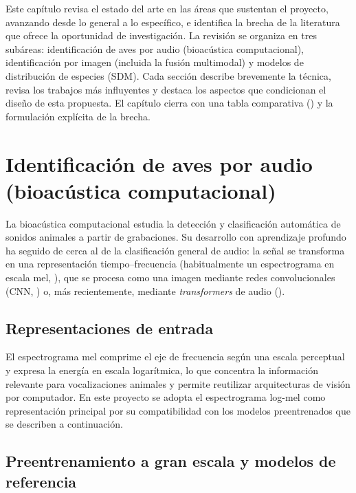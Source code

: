 
Este capítulo revisa el estado del arte en las áreas que sustentan el
proyecto, avanzando desde lo general a lo específico, e identifica la brecha
de la literatura que ofrece la oportunidad de investigación. La revisión se
organiza en tres subáreas: identificación de aves por audio (bioacústica
computacional), identificación por imagen (incluida la fusión multimodal) y
modelos de distribución de especies (SDM). Cada sección describe brevemente la técnica,
revisa los trabajos más influyentes y destaca los aspectos que condicionan el
diseño de esta propuesta. El capítulo cierra con una tabla comparativa
() y la formulación explícita de la brecha.

\section{Identificación de aves por audio (bioacústica computacional)}
\label{sec:rel-audio}

La bioacústica computacional estudia la detección y clasificación automática
de sonidos animales a partir de grabaciones. Su desarrollo con aprendizaje
profundo ha seguido de cerca al de la clasificación general de audio: la
señal se transforma en una representación tiempo--frecuencia (habitualmente
un espectrograma en escala mel, ), que se procesa como una imagen mediante redes
convolucionales (CNN, ) o, más recientemente, mediante
\textit{transformers} de audio ().

\subsection*{Representaciones de entrada}

El espectrograma mel comprime el eje de frecuencia según una escala
perceptual y expresa la energía en escala logarítmica, lo que concentra la
información relevante para vocalizaciones animales y permite reutilizar
arquitecturas de visión por computador. En este proyecto se adopta el
espectrograma log-mel como representación principal por su compatibilidad
con los modelos preentrenados que se describen a continuación.

\subsection*{Preentrenamiento a gran escala y modelos de referencia}

